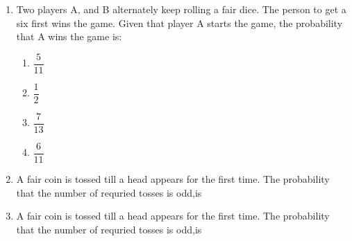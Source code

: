 \renewcommand{\theequation}{\theenumi}
\renewcommand{\thefigure}{\theenumi}
\renewcommand{\thetable}{\theenumi}
\begin{enumerate}[label=\thesection.\arabic*.,ref=\thesection.\theenumi]

\item Two players A, and B alternately keep rolling a fair dice. The person to get a six first wins the game. Given that player A starts the game, the probability that A wins the game is:\\[5pt]
\begin{enumerate}[label=(\Alph*)]
    \item $\dfrac{5}{11}$\\
    \item $\dfrac{1}{2}$ \\
    \item $\dfrac{7}{13}$\\
    \item $\dfrac{6}{11}$
\end{enumerate}
\solution



\item A fair coin is tossed till a head appears for the first time. The probability that the number of requried tosses is odd,is
\begin{enumerate}
\end{enumerate}
\solution


%
\item A fair coin is tossed till a head appears for the first time. The probability that the number of requried tosses is odd,is
\begin{enumerate}
\end{enumerate}
%
\solution



\end{enumerate}

